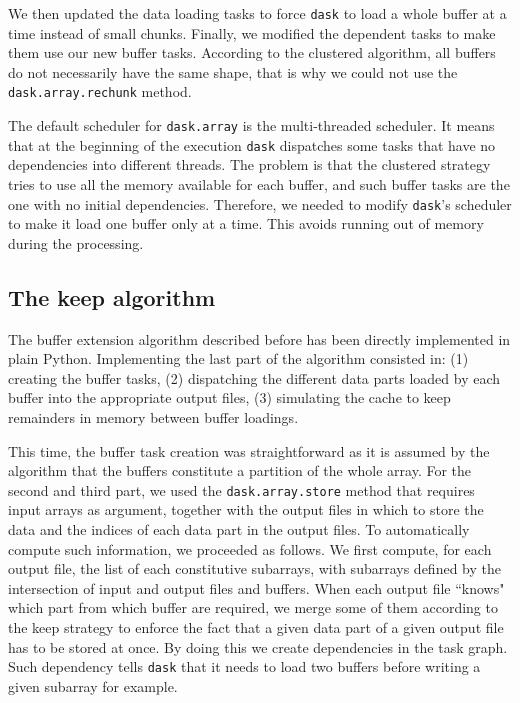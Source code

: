 \documentclass[conference]{IEEEtran}
\begin{document}
We then updated the data loading tasks to force \texttt{dask} to load a whole buffer at
a time instead of small chunks. Finally, we modified the dependent tasks to make
them use our new buffer tasks. According to the clustered algorithm, all buffers
do not necessarily have the same shape, that is why we could not use the
\texttt{dask.array.rechunk} method.

The default scheduler for \texttt{dask.array} is the multi-threaded scheduler. It means
that at the beginning of the execution \texttt{dask} dispatches some tasks that have
no dependencies into different threads. The problem is that the clustered
strategy tries to use all the memory available for each buffer, and such buffer
tasks are the one with no initial dependencies. Therefore, we needed to
modify \texttt{dask}'s scheduler to make it load one buffer only at a time.
This avoids running out of memory during the processing.

\subsection{The keep algorithm}

The buffer extension algorithm described before has been directly
implemented in plain Python. Implementing the last part of the algorithm
consisted in: (1) creating the buffer tasks, (2) dispatching the different data
parts loaded by each buffer into the appropriate output files, (3) simulating
the cache to keep remainders in memory between buffer loadings.

This time, the buffer task creation was straightforward as it is assumed by the
algorithm that the buffers constitute a partition of the whole array. For the
second and third part, we used the \texttt{dask.array.store} method that
requires input arrays as argument, together with the output files in which to
store the data and the indices of each data part in the output files. To
automatically compute such information, we proceeded as follows. We first
compute, for each output file, the list of each constitutive subarrays, with
subarrays defined by the intersection of input and output files and buffers.
When each output file ``knows" which part from which buffer are required, we
merge some of them according to the keep strategy to enforce the fact that
a given data part of a given output file has to be stored at once. By doing this
we create dependencies in the task graph. Such dependency tells \texttt{dask} that it
needs to load two buffers before writing a given subarray for example.
\end{document}
